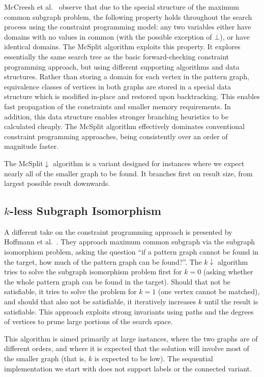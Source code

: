 \documentclass{llncs}
\begin{document}
McCreesh et al.\ \cite{o:McCreeshPT17} observe that due to the special structure of the maximum
common subgraph problem, the following property holds throughout the search process using the
constraint programming model: any two variables either have domains with no values in common (with
the possible exception of $\bot$), or have identical domains. The McSplit algorithm exploits this
property. It explores essentially the same search tree as the basic forward-checking constraint
programming approach, but using different supporting algorithms and data structures.  Rather than
storing a domain for each vertex in the pattern graph, equivalence classes of vertices in both
graphs are stored in a special data structure which is modified in-place and restored upon
backtracking. This enables fast propagation of the constraints and smaller memory requirements. In
addition, this data structure enables stronger branching heuristics to be calculated cheaply. The
McSplit algorithm effectively dominates conventional constraint programming approaches, being
consistently over an order of magnitude faster.

The McSplit$\downarrow$ algorithm is a variant designed for instances where we expect nearly all of
the smaller graph to be found. It branches first on result size, from largest possible result
downwards.

\subsection{$k$-less Subgraph Isomorphism}

A different take on the constraint programming approach is presented by
Hoffmann et al.\ \cite{DBLP:conf/aaai/HoffmannMR17}. They approach maximum common subgraph via the
subgraph isomorphism problem, asking the question ``if a pattern graph cannot be found in the
target, how much of the pattern graph can be found?''. The $k{\downarrow}$ algorithm tries to solve
the subgraph isomorphism problem first for $k=0$ (asking whether the whole pattern graph can be found in the
target). Should that not be satisfiable, it tries to solve the problem for $k=1$ (one vertex cannot
be matched), and should that also not be satisfiable, it iteratively increases $k$ until the result
is satisfiable. This approach exploits strong invariants using paths and the degrees of vertices to
prune large portions of the search space.

This algorithm is aimed primarily at large instances, where the two graphs are of different orders,
and where it is expected that the solution will involve most of the smaller graph (that is, $k$ is
expected to be low). The sequential implementation we start with does not support labels or the
connected variant.
\end{document}
